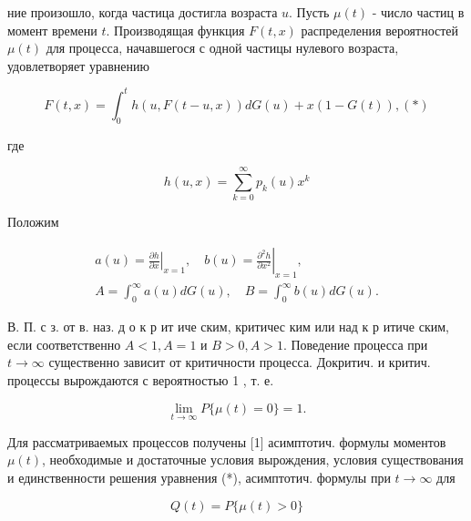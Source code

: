 \documentclass[10pt]{article}
\begin{document}
ние произошло, когда частица достигла возраста $u$. Пусть $\mu(t)$ - число частиц в момент времени $t$. Производящая функция $F(t, x)$ распределения вероятностей $\mu(t)$ для процесса, начавшегося с одной частицы нулевого возраста, удовлетворяет уравнению



\[

F(t, x)=\int_{0}^{t} h(u, F(t-u, x)) d G(u)+x(1-G(t)),(*)

\]



где



\[

h(u, x)=\sum_{k=0}^{\infty} p_{k}(u) x^{k}

\]



Положим



\[

\begin{gathered}

a(u)=\left.\frac{\partial h}{\partial x}\right|_{x=1}, \quad b(u)=\left.\frac{\partial^{2} h}{\partial x^{2}}\right|_{x=1}, \\

A=\int_{0}^{\infty} a(u) d G(u), \quad B=\int_{0}^{\infty} b(u) d G(u) .

\end{gathered}

\]



В. П. с з. от в. наз. д о к р ит иче ским, критичес ким или над к р итиче ским, если соответственно $A<1, A=1$ и $B>0, A>1$. Поведение процесса при $t \rightarrow \infty$ существенно зависит от критичности процесса. Докритич. и критич. процессы вырождаются с вероятностью 1 , т. е.



\[

\lim _{t \rightarrow \infty} P\{\mu(t)=0\}=1 .

\]



Для рассматриваемых процессов получены [1] асимптотич. формулы моментов $\mu(t)$, необходимые и достаточные условия вырождения, условия существования и единственности решения уравнения (*), асимптотич. формулы при $t \rightarrow \infty$ для



\[

Q(t)=P\{\mu(t)>0\}

\]
\end{document}
